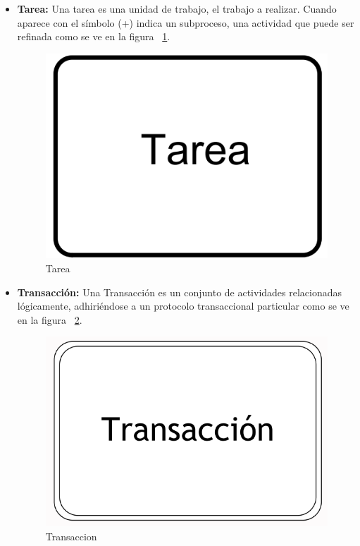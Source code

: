 \begin{itemize}
	\item \textbf{Tarea:} Una tarea es una unidad de trabajo, el trabajo a realizar. Cuando aparece con el símbolo (+) indica un subproceso, una actividad que puede ser refinada como se ve en la figura ~\ref{fig:Tarea}.
	\begin{figure}[H]
		\centering
		\includegraphics[scale=0.2]{Capitulo2/imagenes/tarea} 
		\caption{Tarea}
		\label{fig:Tarea}
	\end{figure}
	
	\item \textbf{Transacción:} Una Transacción es un conjunto de actividades relacionadas lógicamente, adhiriéndose a un protocolo transaccional particular como se ve en la figura ~\ref{fig:Transaccion}.
	\begin{figure}[h]
		\centering
		\includegraphics[scale=0.2]{Capitulo2/imagenes/Transaccion} 
		\caption{Transaccion}
		\label{fig:Transaccion}
	\end{figure}
	

\end{itemize}
